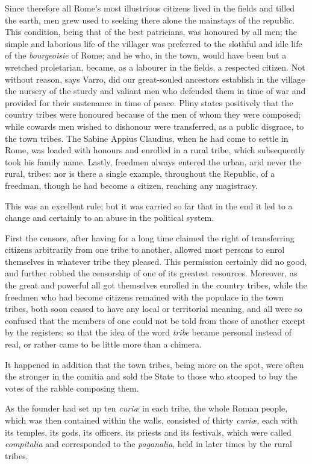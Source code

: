\documentclass[12pt]{report}
\begin{document}
Since therefore all Rome's most illustrious citizens lived in the fields and tilled the earth, men grew used to seeking there alone the mainstays of the republic. This condition, being that of the best patricians, was honoured by all men; the simple and laborious life of the villager was preferred to the slothful and idle life of the \textit{bourgeoisie} of Rome; and he who, in the town, would have been but a wretched proletarian, became, as a labourer in the fields, a respected citizen. Not without reason, says Varro, did our great-souled ancestors establish in the village the nursery of the sturdy and valiant men who defended them in time of war and provided for their sustenance in time of peace. Pliny states positively that the country tribes were honoured because of the men of whom they were composed; while cowards men wished to dishonour were transferred, as a public disgrace, to the town tribes. The Sabine Appius Claudius, when he had come to settle in Rome, was loaded with honours and enrolled in a rural tribe, which subsequently took his family name. Lastly, freedmen always entered the urban, arid never the rural, tribes: nor is there a single example, throughout the Republic, of a freedman, though he had become a citizen, reaching any magistracy.

This was an excellent rule; but it was carried so far that in the end it led to a change and certainly to an abuse in the political system.

First the censors, after having for a long time claimed the right of transferring citizens arbitrarily from one tribe to another, allowed most persons to enrol themselves in whatever tribe they pleased. This permission certainly did no good, and further robbed the censorship of one of its greatest resources. Moreover, as the great and powerful all got themselves enrolled in the country tribes, while the freedmen who had become citizens remained with the populace in the town tribes, both soon ceased to have any local or territorial meaning, and all were so confused that the members of one could not be told from those of another except by the registers; so that the idea of the word \textit{tribe} became personal instead of real, or rather came to be little more than a chimera.

It happened in addition that the town tribes, being more on the spot, were often the stronger in the comitia and sold the State to those who stooped to buy the votes of the rabble composing them.

As the founder had set up ten \textit{curiæ} in each tribe, the whole Roman people, which was then contained within the walls, consisted of thirty \textit{curiæ}, each with its temples, its gods, its officers, its priests and its festivals, which were called \textit{compitalia} and corresponded to the \textit{paganalia}, held in later times by the rural tribes.
\end{document}

